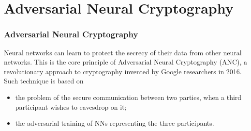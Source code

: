 \documentclass{beamer}
\begin{document}
\section[ANC]{Adversarial Neural Cryptography}
\begin{frame}
\frametitle{Adversarial Neural Cryptography}
Neural networks can learn to protect the secrecy of their data from other neural networks. This is the core principle of Adversarial Neural Cryptography (ANC), a revolutionary approach to cryptography invented by Google researchers in 2016. Such technique is based on\\
\begin{itemize}
\item  the problem of the secure communication between two parties, when a third participant wishes to eavesdrop on it;
\item the adversarial training of NNs representing the three participants.
\end{itemize}


\end{frame}
\end{document}
